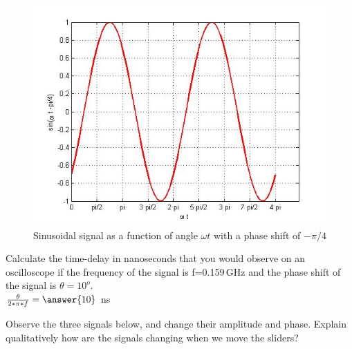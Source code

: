 \documentclass{ximera}
\begin{document}
\begin{figure} [htbp]
\includegraphics[scale=0.4]{../jpg/cpef4.jpg}
\caption{Sinusoidal signal as a function of angle $\omega t$ with a phase shift of $-\pi/4$}
\label{sinMinus45Ph}
\end{figure}



\begin{question}  
Calculate the time-delay in nanoseconds that you would observe on an oscilloscope if the frequency of the signal is f=0.159\,GHz and the phase shift of the signal is $\theta=10^o$. \\
$ \frac{\theta}{2*\pi*f} = \answer{10}$  ns
\end{question} 

\begin{example}
Observe the three signals below, and change their amplitude and phase. Explain qualitatively how are the signals changing when we move the sliders?
\begin{center}  
\end{center} 
\end{example}
\end{document}
